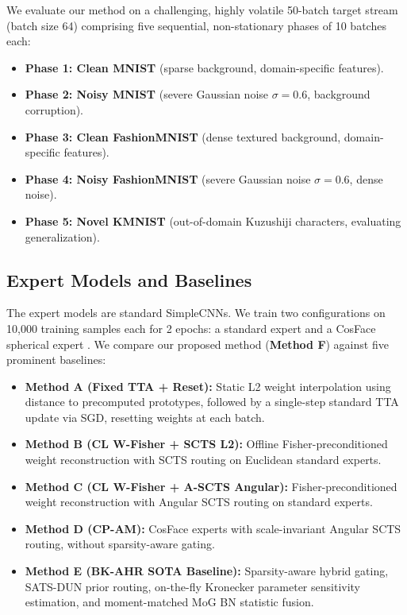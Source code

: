 \documentclass{article}
\theoremstyle{plain}
\theoremstyle{definition}
\theoremstyle{remark}
\begin{document}
We evaluate our method on a challenging, highly volatile 50-batch target stream (batch size 64) comprising five sequential, non-stationary phases of 10 batches each:
\begin{itemize}
    \item \textbf{Phase 1: Clean MNIST} (sparse background, domain-specific features).
    \item \textbf{Phase 2: Noisy MNIST} (severe Gaussian noise $\sigma=0.6$, background corruption).
    \item \textbf{Phase 3: Clean FashionMNIST} (dense textured background, domain-specific features).
    \item \textbf{Phase 4: Noisy FashionMNIST} (severe Gaussian noise $\sigma=0.6$, dense noise).
    \item \textbf{Phase 5: Novel KMNIST} (out-of-domain Kuzushiji characters, evaluating generalization).
\end{itemize}

\subsection{Expert Models and Baselines}
The expert models are standard SimpleCNNs. We train two configurations on 10,000 training samples each for 2 epochs: a standard expert and a CosFace spherical expert \cite{cp_am}.
We compare our proposed method (\textbf{Method F}) against five prominent baselines:
\begin{itemize}
    \item \textbf{Method A (Fixed TTA + Reset):} Static L2 weight interpolation using distance to precomputed prototypes, followed by a single-step standard TTA update via SGD, resetting weights at each batch.
    \item \textbf{Method B (CL W-Fisher + SCTS L2):} Offline Fisher-preconditioned weight reconstruction with SCTS routing on Euclidean standard experts.
    \item \textbf{Method C (CL W-Fisher + A-SCTS Angular):} Fisher-preconditioned weight reconstruction with Angular SCTS routing on standard experts.
    \item \textbf{Method D (CP-AM):} CosFace experts with scale-invariant Angular SCTS routing, without sparsity-aware gating.
    \item \textbf{Method E (BK-AHR SOTA Baseline):} Sparsity-aware hybrid gating, SATS-DUN prior routing, on-the-fly Kronecker parameter sensitivity estimation, and moment-matched MoG BN statistic fusion.
\end{itemize}
\end{document}
